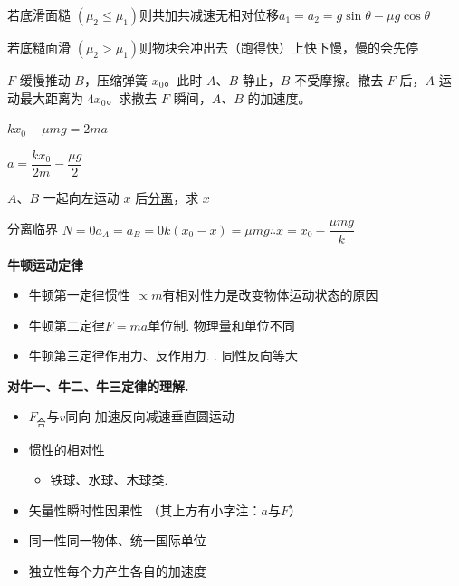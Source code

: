 若底滑面糙 $(\mu_2\le\mu_1)$\quad 则共加共减速\quad 无相对位移\quad $a_1=a_2=g\sin\theta-\mu g\cos\theta$ %

若底糙面滑 $(\mu_2>\mu_1)$\quad 则物块会冲出去（跑得快）\quad 上快下慢，慢的会先停
\begin{problem}[{[4]}]
$F$ 缓慢推动 $B$，压缩弹簧 $x_0$。此时 $A$、$B$ 静止，$B$ 不受摩擦。撤去 $F$ 后，$A$ 运动最大距离为 $4x_0$。求撤去 $F$ 瞬间，$A$、$B$ 的加速度。

\noindent $kx_0-\mu mg=2ma$%

\noindent $a=\dfrac{kx_0}{2m}-\dfrac{\mu g}{2}$

\noindent $A$、$B$ 一起向左运动 $x$ 后\underline{分离}，求 $x$%

\noindent 分离临界 $N=0$\quad $a_A=a_B=0$\qquad $k(x_0-x)=\mu mg$\qquad $\therefore x=x_0-\dfrac{\mu mg}{k}$
\end{problem}
\textbf{牛顿运动定律}
\begin{itemize}
\item 牛顿第一定律\quad 惯性 $\propto m$\quad 有相对性\quad 力是改变物体运动状态的原因 %
\item 牛顿第二定律\quad $F=ma$\quad 单位制. 物理量和单位不同
\item 牛顿第三定律\quad 作用力、反作用力. . 同性反向等大
\end{itemize}
\textbf{对牛一、牛二、牛三定律的理解.}
\begin{itemize}
\item $F_{\text{合}}$与$v$同向 加速\quad 反向减速\quad 垂直圆运动 %
\item 惯性的相对性
  \begin{itemize}
  \item 铁球、水球、木球类.
  \end{itemize}
\item 矢量性\quad 瞬时性\quad 因果性 \quad （其上方有小字注：$a$与$F$）
\item 同一性\quad 同一物体、统一国际单位
\item 独立性\quad 每个力产生各自的加速度
\end{itemize}
